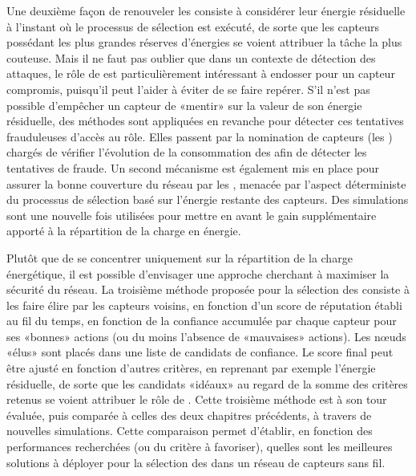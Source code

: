 Une deuxième façon de renouveler les \cnst consiste à considérer leur énergie résiduelle à l'instant où le processus de sélection est exécuté, de sorte que les capteurs possédant les plus grandes réserves d'énergies se voient attribuer la tâche la plus couteuse.
Mais il ne faut pas oublier que dans un contexte de détection des attaques, le rôle de \cnt est particulièrement intéressant à endosser pour un capteur compromis, puisqu'il peut l'aider à éviter de se faire repérer.
S'il n'est pas possible d'empêcher un capteur de «mentir» sur la valeur de son énergie résiduelle, des méthodes sont appliquées en revanche pour détecter ces tentatives frauduleuses d'accès au rôle.
Elles passent par la nomination de capteurs (les \vnst) chargés de vérifier l'évolution de la consommation des \cnst afin de détecter les tentatives de fraude.
Un second mécanisme est également mis en place pour assurer la bonne couverture du réseau par les \cnst, menacée par l'aspect déterministe du processus de sélection basé sur l'énergie restante des capteurs.
Des simulations sont une nouvelle fois utilisées pour mettre en avant le gain supplémentaire apporté à la répartition de la charge en énergie.

Plutôt que de se concentrer uniquement sur la répartition de la charge énergétique, il est possible d'envisager une approche cherchant à maximiser la sécurité du réseau.
La troisième méthode proposée pour la sélection des \cnst consiste à les faire élire par les capteurs voisins, en fonction d'un score de réputation établi au fil du temps, \cad en fonction de la confiance accumulée par chaque capteur pour ses «bonnes» actions (ou du moins l'absence de «mauvaises» actions).
Les nœuds «élus» sont placés dans une liste de candidats de confiance.
Le score final peut être ajusté en fonction d'autres critères, en reprenant par exemple l'énergie résiduelle, de sorte que les candidats «idéaux» au regard de la somme des critères retenus se voient attribuer le rôle de \cnt.
Cette troisième méthode est à son tour évaluée, puis comparée à celles des deux chapitres précédents, à travers de nouvelles simulations.
Cette comparaison permet d'établir, en fonction des performances recherchées (ou du critère à favoriser), quelles sont les meilleures solutions à déployer pour la sélection des \cnst dans un réseau de capteurs sans fil.


